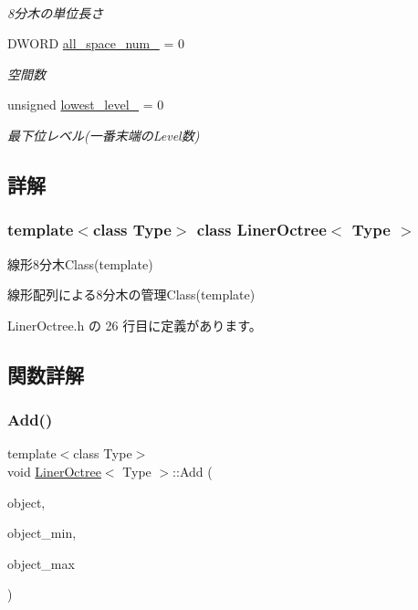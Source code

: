 \begin{DoxyCompactItemize}
$$\begin{DoxyCompactList}\small\item\em 8分木の単位長さ \end{DoxyCompactList}\item 
D\+W\+O\+RD \mbox{\hyperlink{class_liner_octree_aff1d6fcdf606bb2e42461714c0e7aa50}{all\+\_\+space\+\_\+num\+\_\+}} = 0
\begin{DoxyCompactList}\small\item\em 空間数 \end{DoxyCompactList}\item 
unsigned \mbox{\hyperlink{class_liner_octree_aa62a6ad34ceed4a8fef93123ca45350d}{lowest\+\_\+level\+\_\+}} = 0
\begin{DoxyCompactList}\small\item\em 最下位レベル(一番末端の\+Level数) \end{DoxyCompactList}\end{DoxyCompactItemize}


\subsection{詳解}
\subsubsection*{template$<$class Type$>$\newline
class Liner\+Octree$<$ Type $>$}

線形8分木\+Class(template) 

線形配列による8分木の管理\+Class(template) 

 Liner\+Octree.\+h の 26 行目に定義があります。



\subsection{関数詳解}
\mbox{\label{class_liner_octree_a3eaccf8098efa5354aecb4f682ffd400}} 
\subsubsection{\texorpdfstring{Add()}{Add()}}
{\footnotesize\ttfamily template$<$class Type$>$ \\
void \mbox{\hyperlink{class_liner_octree}{Liner\+Octree}}$<$ Type $>$\+::Add (\begin{DoxyParamCaption}\item[{\mbox{\hyperlink{class_object_of_tree}{Object\+Of\+Tree}}$<$ Type $>$ $\ast$}]{object,  }\item[{const \mbox{\hyperlink{class_vector3_d}{Vector3D}} $\ast$}]{object\+\_\+min,  }\item[{const \mbox{\hyperlink{class_vector3_d}{Vector3D}} $\ast$}]{object\+\_\+max }\end{DoxyParamCaption})\hspace{0.3cm}{\ttfamily [inline]}}



